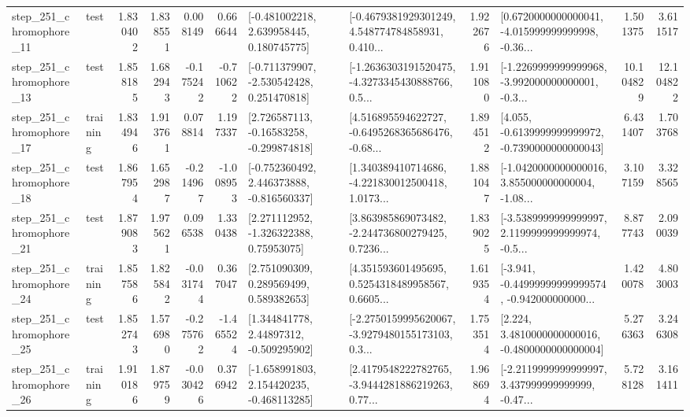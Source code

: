 \begin{tabular}{llrrrrllrlrr}
  step\_251\_chromophore\_11 &      test &      1.830402 &    1.838551 &      0.008149 &  0.666644 &    [-0.481002218, 2.639958445, 0.180745775] &  [-0.4679381929301249, 4.548774784858931, 0.410... &       1.922676 &  [0.6720000000000041, -4.015999999999998, -0.36... &            1.501375 &          3.611517 \\
  step\_251\_chromophore\_13 &      test &      1.858185 &    1.682943 &     -0.175242 & -0.710622 &   [-0.711379907, -2.530542428, 0.251470818] &  [-1.2636303191520475, -4.3273345430888766, 0.5... &       1.911080 &  [-1.2269999999999968, -3.992000000000001, -0.3... &           10.104829 &         12.104822 \\
  step\_251\_chromophore\_17 &  training &      1.834946 &    1.913761 &      0.078814 &  1.197337 &    [2.726587113, -0.16583258, -0.299874818] &  [4.516895594622727, -0.6495268365686476, -0.68... &       1.894512 &  [4.055, -0.6139999999999972, -0.7390000000000043] &            6.431407 &          1.703768 \\
  step\_251\_chromophore\_18 &      test &      1.867954 &    1.652987 &     -0.214967 & -1.008953 &   [-0.752360492, 2.446373888, -0.816560337] &  [1.340389410714686, -4.221830012500418, 1.0173... &       1.881047 &  [-1.0420000000000016, 3.855000000000004, -1.08... &            3.107159 &          3.328565 \\
  step\_251\_chromophore\_21 &      test &      1.879083 &    1.975621 &      0.096538 &  1.330438 &     [2.271112952, -1.326322388, 0.75953075] &  [3.863985869073482, -2.244736800279425, 0.7236... &       1.839025 &  [-3.5389999999999997, 2.1199999999999974, -0.5... &            8.877743 &          2.090039 \\
  step\_251\_chromophore\_24 &  training &      1.857586 &    1.825842 &     -0.031744 &  0.367047 &     [2.751090309, 0.289569499, 0.589382653] &  [4.351593601495695, 0.5254318489958567, 0.6605... &       1.619354 &  [-3.941, -0.44999999999999574, -0.942000000000... &            1.420078 &          4.803003 \\
  step\_251\_chromophore\_25 &      test &      1.852743 &    1.576980 &     -0.275762 & -1.465524 &     [1.344841778, 2.44897312, -0.509295902] &  [-2.2750159995620067, -3.9279480155173103, 0.3... &       1.753514 &   [2.224, 3.4810000000000016, -0.4800000000000004] &            5.276363 &          3.246308 \\
  step\_251\_chromophore\_26 &  training &      1.910186 &    1.879759 &     -0.030426 &  0.376942 &   [-1.658991803, 2.154420235, -0.468113285] &  [2.4179548222782765, -3.9444281886219263, 0.77... &       1.968694 &  [-2.2119999999999997, 3.437999999999999, -0.47... &            5.728128 &          3.161411 \\

\end{tabular}
